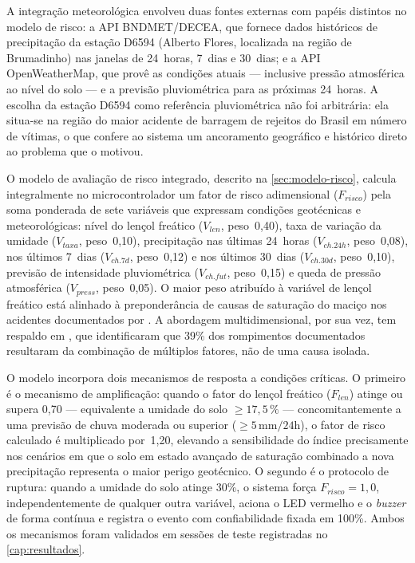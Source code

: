 A integração meteorológica envolveu duas fontes externas com papéis
distintos no modelo de risco: a API BNDMET/DECEA, que fornece dados
históricos de precipitação da estação D6594 (Alberto Flores, localizada
na região de Brumadinho) nas janelas de 24~horas, 7~dias e 30~dias; e
a API OpenWeatherMap, que provê as condições atuais --- inclusive pressão
atmosférica ao nível do solo --- e a previsão pluviométrica para as
próximas 24~horas. A escolha da estação D6594 como referência
pluviométrica não foi arbitrária: ela situa-se na região do maior
acidente de barragem de rejeitos do Brasil em número de vítimas, o que
confere ao sistema um ancoramento geográfico e histórico direto ao
problema que o motivou.

O modelo de avaliação de risco integrado, descrito na
\autoref{sec:modelo-risco}, calcula integralmente no microcontrolador
um fator de risco adimensional ($F_{risco}$) pela soma ponderada de
sete variáveis que expressam condições geotécnicas e meteorológicas:
nível do lençol freático ($V_{len}$, peso~0,40), taxa de variação da
umidade ($V_{taxa}$, peso~0,10), precipitação nas últimas 24~horas
($V_{ch.24h}$, peso~0,08), nos últimos 7~dias ($V_{ch.7d}$, peso~0,12)
e nos últimos 30~dias ($V_{ch.30d}$, peso~0,10), previsão de intensidade
pluviométrica ($V_{ch.fut}$, peso~0,15) e queda de pressão atmosférica
($V_{press}$, peso~0,05). O maior peso atribuído à variável de lençol
freático está alinhado à preponderância de causas de saturação do
maciço nos acidentes documentados por .
A abordagem multidimensional, por sua vez, tem respaldo em
, que identificaram que 39\% dos rompimentos
documentados resultaram da combinação de múltiplos fatores, não de uma
causa isolada.

O modelo incorpora dois mecanismos de resposta a condições críticas. O
primeiro é o mecanismo de amplificação: quando o fator do lençol
freático ($F_{len}$) atinge ou supera 0,70 --- equivalente a umidade do
solo $\geq 17{,}5\,\%$ --- concomitantemente a uma previsão de chuva
moderada ou superior ($\geq 5\,\text{mm}/24\text{h}$), o fator de risco
calculado é multiplicado por~1,20, elevando a sensibilidade do índice
precisamente nos cenários em que o solo em estado avançado de saturação
combinado a nova precipitação representa o maior perigo geotécnico. O segundo é o
protocolo de ruptura: quando a umidade do solo atinge 30\%, o sistema
força $F_{risco} = 1{,}0$, independentemente de qualquer outra variável,
aciona o LED vermelho e o \textit{buzzer} de forma contínua e registra
o evento com confiabilidade fixada em 100\%. Ambos os mecanismos foram
validados em sessões de teste registradas no \autoref{cap:resultados}.

